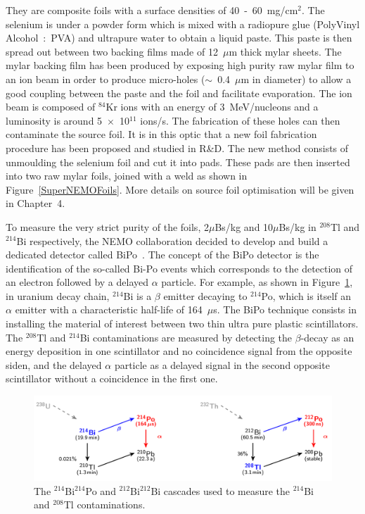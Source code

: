 \documentclass[main.tex]{subfiles}
\begin{document}
\NI They are composite foils with a surface densities of 40~-~60~mg/cm$^\text{2}$. The selenium is under a powder form which is mixed with a radiopure glue (PolyVinyl Alcohol~:~PVA) and ultrapure water to obtain a liquid paste. This paste is then spread out between two backing films made of 12~$\mu$m thick mylar sheets. The mylar backing film has been produced by exposing high purity raw mylar film to an ion beam in order to produce micro-holes ($\sim$~0.4~$\mu$m in diameter) to allow a good coupling between the paste and the foil and facilitate evaporation. The ion beam is composed of $^{\text{84}}$Kr ions with an energy of 3~MeV/nucleons and a luminosity is around 5~$\times$~10$^{\text{11}}$ ions/s. The fabrication of these holes can then contaminate the source foil. It is in this optic that a new foil fabrication procedure has been proposed and studied in R\&D. The new method consists of unmoulding the selenium foil and cut it into pads. These pads are then inserted into two raw mylar foils, joined with a weld as shown in Figure~\ref{SuperNEMOFoils}. More details on source foil optimisation will be given in Chapter~4.


\bigskip


\NI To measure the very strict purity of the foils, 2$\mu$Bs/kg and 10$\mu$Bs/kg in $^{\text{208}}$Tl and $^{\text{214}}$Bi respectively, the NEMO collaboration decided to develop and build a dedicated detector called BiPo~\cite{BiPoDetector}. The concept of the BiPo detector is the identification of the so-called Bi-Po events which corresponds to the detection of an electron followed by a delayed $\alpha$ particle. For example, as shown in Figure~\ref{BiPoDecayChain}, in uranium decay chain, $^{\text{214}}$Bi is a $\beta$ emitter decaying to $^{\text{214}}$Po, which is itself an $\alpha$ emitter with a characteristic half-life of 164~$\mu$s. The BiPo technique consists in installing the material of interest between two thin ultra pure plastic scintillators. The $^{\text{208}}$Tl and $^{\text{214}}$Bi contaminations are measured by detecting the $\beta$-decay as an energy deposition in one scintillator and no coincidence signal from the opposite siden, and the delayed $\alpha$ particle as a delayed signal in the second opposite scintillator without a coincidence in the first one. 


\begin{figure}[h!]
\begin{center}
\includegraphics[scale=0.33]{pictures/Chap3/BiPoDecayChain.png}
\caption{The $^{\text{214}}$Bi$^{\text{214}}$Po and $^{\text{212}}$Bi$^{\text{212}}$Bi cascades used to measure the $^{\text{214}}$Bi and $^{\text{208}}$Tl contaminations.}
\label{BiPoDecayChain}
\end{center}
\end{figure}
\end{document}
